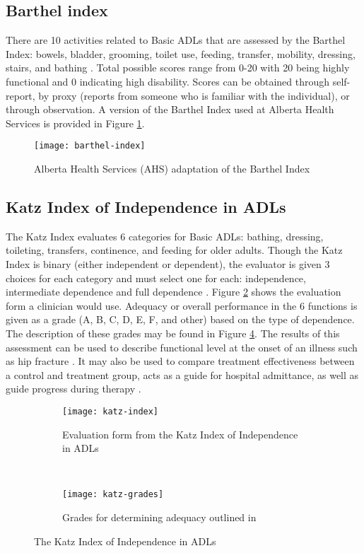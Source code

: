 \clearpage
\subsection{Barthel index}
There are 10 activities related to Basic ADLs that are assessed by the Barthel Index: bowels, bladder, grooming, toilet use, feeding, transfer, mobility, dressing, stairs, and bathing \cite{ahs_barthel_nodate}. Total possible scores range from 0-20 with 20 being highly functional and 0 indicating high disability. Scores can be obtained through self-report, by proxy (reports from someone who is familiar with the individual), or through observation. A version of the Barthel Index used at Alberta Health Services is provided in Figure \ref{fig:barthel-index}.

\begin{figure}[ht]
    \centering
    \texttt{[image: barthel-index]}
    \caption{Alberta Health Services (AHS) adaptation of the Barthel Index \cite{ahs_barthel_nodate}}
    \label{fig:barthel-index}
\end{figure}

\clearpage
\subsection{Katz Index of Independence in ADLs}
The Katz Index evaluates 6 categories for Basic ADLs: bathing, dressing, toileting, transfers, continence, and feeding for older adults. Though the Katz Index is binary (either independent or dependent), the evaluator is given 3 choices for each category and must select one for each: independence, intermediate dependence and full dependence \cite{katz_studies_1963}. Figure \ref{fig:katz-index} shows the evaluation form a clinician would use. Adequacy or overall performance in the 6 functions is given as a grade (A, B, C, D, E, F, and other) based on the type of dependence. The description of these grades may be found in Figure \ref{fig:katz-grades}. The results of this assessment can be used to describe functional level at the onset of an illness such as hip fracture \cite{katz_studies_1963}. It may also be used to compare treatment effectiveness between a control and treatment group, acts as a guide for hospital admittance, as well as guide progress during therapy \cite{katz_studies_1963}.

\begin{figure}[ht!]
    \centering
    \begin{subfigure}[t]{.4\textwidth}
        \centering
        \texttt{[image: katz-index]}
        \caption{Evaluation form from the Katz Index of Independence in ADLs \cite{katz_studies_1963}}
        \label{fig:katz-index}
    \end{subfigure}
    ~~~
    \begin{subfigure}[t]{.4\textwidth}
        \centering
        \texttt{[image: katz-grades]}
        \caption{Grades for determining adequacy outlined in \cite{katz_studies_1963}}
        \label{fig:katz-grades}
    \end{subfigure}
    \caption{The Katz Index of Independence in ADLs \cite{katz_studies_1963}}
\end{figure}

